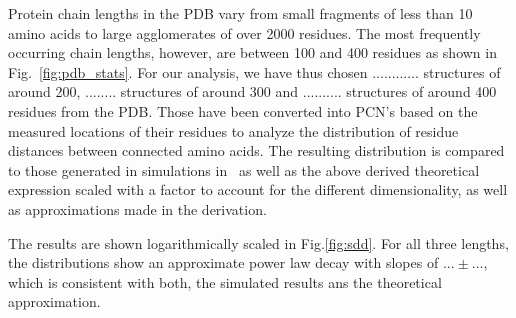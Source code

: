 \documentclass[
reprint,
twocolumn,
amsmath,amssymb,superscriptaddress,aps,
pre]{revtex4-1}
\newcommand{\red}[1]{\textcolor{red!80!black}{#1}}
\newcommand{\blue}[1]{\textcolor{blue!80!black}{#1}}
\begin{document}
Protein chain lengths in the PDB vary from small fragments of less than 10 amino acids to large agglomerates of over 2000 residues. The most frequently occurring chain lengths, however, are between 100 and 400 residues as shown in Fig.~\ref{fig:pdb_stats}. \red{For our analysis, we have thus chosen ............ structures of around 200, ........ structures of around 300 and .......... structures of around 400 residues from the PDB.} Those have been converted into PCN's based on the measured locations of their residues to analyze the distribution of residue distances between connected amino acids. The resulting distribution is compared to those generated in simulations in~\cite{molkenthin2020self} \blue{as well as the above derived theoretical expression scaled with a factor to account for the different dimensionality, as well as approximations made in the derivation.}

The results are shown logarithmically scaled in Fig.\ref{fig:sdd}. \red{For all three lengths, the distributions show an approximate power law decay with slopes of $...\pm ...$, which is consistent with both, the simulated results ans the theoretical approximation.}
\end{document}
